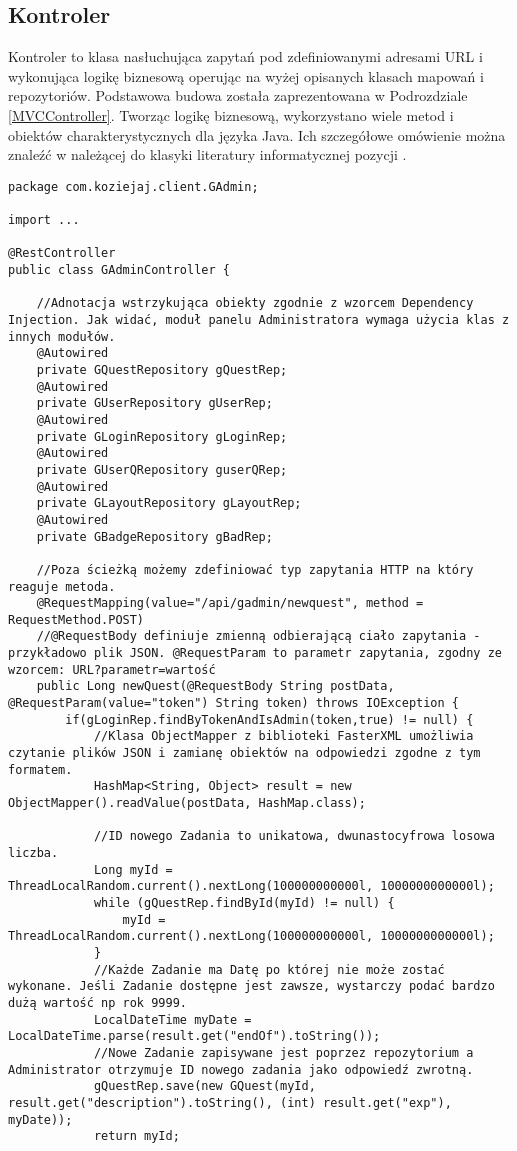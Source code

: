 \documentclass[a4paper,12pt,twoside,openany]{report}
\begin{document}
\subsection{Kontroler}
Kontroler to klasa nasłuchująca  zapytań pod zdefiniowanymi adresami URL i wykonująca logikę biznesową operując na wyżej opisanych klasach mapowań i repozytoriów. Podstawowa budowa została zaprezentowana w Podrozdziale \ref{MVCController}. Tworząc logikę biznesową, wykorzystano wiele metod i obiektów charakterystycznych dla języka Java. Ich szczegółowe omówienie można znaleźć w należącej do klasyki literatury informatycznej pozycji \cite{Java}.
\newpage
\begin{lstlisting}
package com.koziejaj.client.GAdmin;

import ...

@RestController
public class GAdminController {

	//Adnotacja wstrzykująca obiekty zgodnie z wzorcem Dependency Injection. Jak widać, moduł panelu Administratora wymaga użycia klas z innych modułów.
    @Autowired
    private GQuestRepository gQuestRep;
    @Autowired
    private GUserRepository gUserRep;
    @Autowired
    private GLoginRepository gLoginRep;
    @Autowired
    private GUserQRepository guserQRep;
    @Autowired
    private GLayoutRepository gLayoutRep;
    @Autowired
    private GBadgeRepository gBadRep;
	
	//Poza ścieżką możemy zdefiniować typ zapytania HTTP na który reaguje metoda.
    @RequestMapping(value="/api/gadmin/newquest", method = RequestMethod.POST)
    //@RequestBody definiuje zmienną odbierającą ciało zapytania - przykładowo plik JSON. @RequestParam to parametr zapytania, zgodny ze wzorcem: URL?parametr=wartość
    public Long newQuest(@RequestBody String postData, @RequestParam(value="token") String token) throws IOException {
        if(gLoginRep.findByTokenAndIsAdmin(token,true) != null) {
	        //Klasa ObjectMapper z biblioteki FasterXML umożliwia czytanie plików JSON i zamianę obiektów na odpowiedzi zgodne z tym formatem.
            HashMap<String, Object> result = new ObjectMapper().readValue(postData, HashMap.class);
            
			//ID nowego Zadania to unikatowa, dwunastocyfrowa losowa liczba.
            Long myId = ThreadLocalRandom.current().nextLong(100000000000l, 1000000000000l);
            while (gQuestRep.findById(myId) != null) {
                myId = ThreadLocalRandom.current().nextLong(100000000000l, 1000000000000l);
            }
            //Każde Zadanie ma Datę po której nie może zostać wykonane. Jeśli Zadanie dostępne jest zawsze, wystarczy podać bardzo dużą wartość np rok 9999.
            LocalDateTime myDate = LocalDateTime.parse(result.get("endOf").toString());
            //Nowe Zadanie zapisywane jest poprzez repozytorium a Administrator otrzymuje ID nowego zadania jako odpowiedź zwrotną.
            gQuestRep.save(new GQuest(myId, result.get("description").toString(), (int) result.get("exp"), myDate));
            return myId;


\end{lstlisting}
\end{document}
